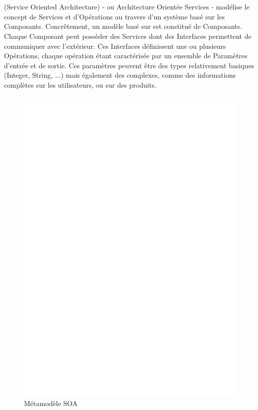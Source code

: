 \section{\kwsoa}\label{sub:soa}

\kwsoa{} (Service Oriented Architecture) - ou Architecture Orientée Services - modélise le concept de Services et d'Opérations au travers d'un système basé sur les Composants. Concrêtement, un modèle basé sur \kwsoa est constitué de Composants. Chaque Composant peut possèder des Services dont des Interfaces permettent de communiquer avec l'extérieur. Ces Interfaces définissent une ou plusieurs Opérations, chaque opération étant caractérisée par un ensemble de Paramètres d'entrée et de sortie. Ces paramètres peuvent être des types relativement basiques (Integer, String, ...) mais également des  complexes, comme des informations complètes sur les utilisateurs, ou sur des produits.	

\begin{figure}[htb]
  \centering
  \includegraphics[scale=.3]{img/SOA.eps}
  \caption{Métamodèle SOA}
  \label{fig:soa}
\end{figure}


